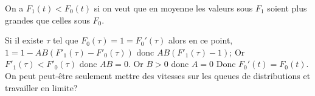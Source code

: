 On a $F_1(t) < F_0(t)$ si on veut que en moyenne les valeurs sous $F_1$ soient plus grandes que celles sous $F_0$. 


 Si il existe  $\tau$ tel que $F_0(\tau) = 1 = F_0'(\tau)$ alors en ce point, 
  $ 1 = 1 - AB (F'_1(\tau) - F'_0(\tau))$ donc  $ AB (F'_1(\tau)-1)$; 
  Or  $F'_1(\tau) < F'_0(\tau)$ donc $AB = 0$. Or $B>0$ donc $A = 0$ Donc $F_0'(t) = F_0(t)$. \\
  
  
  

   
On peut peut-être seulement mettre des vitesses sur les queues de distributions et travailler en limite? 







